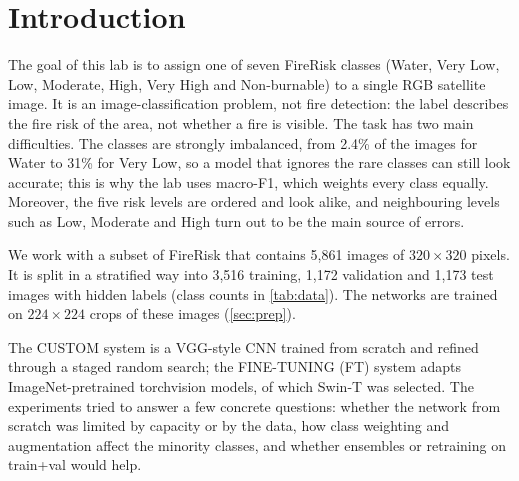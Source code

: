 \section{Introduction}\label{sec:intro}

The goal of this lab is to assign one of seven FireRisk classes (Water, Very Low, Low, Moderate, High, Very High and Non-burnable) to a single RGB satellite image. It is an image-classification problem, not fire detection: the label describes the fire risk of the area, not whether a fire is visible. The task has two main difficulties. The classes are strongly imbalanced, from 2.4\% of the images for Water to 31\% for Very Low, so a model that ignores the rare classes can still look accurate; this is why the lab uses macro-F1, which weights every class equally. Moreover, the five risk levels are ordered and look alike, and neighbouring levels such as Low, Moderate and High turn out to be the main source of errors.

We work with a subset of FireRisk \citep{shen2023firerisk} that contains 5,861 images of $320\times320$ pixels. It is split in a stratified way into 3,516 training, 1,172 validation and 1,173 test images with hidden labels (class counts in \cref{tab:data}). The networks are trained on $224\times224$ crops of these images (\cref{sec:prep}).

The CUSTOM system is a VGG-style CNN trained from scratch and refined through a staged random search; the FINE-TUNING (FT) system adapts ImageNet-pretrained torchvision models, of which Swin-T was selected. The experiments tried to answer a few concrete questions: whether the network from scratch was limited by capacity or by the data, how class weighting and augmentation affect the minority classes, and whether ensembles or retraining on train+val would help.
